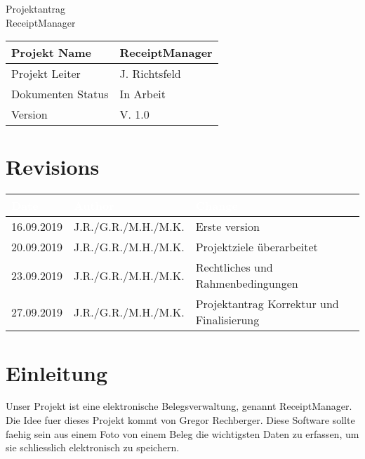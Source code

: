 \documentclass[12pt]{article}
\theoremstyle{definition}
\newcommand{\projectname}{ReceiptManager}
\newcommand{\productname}{ReceiptManager}
\newcommand{\projectleader}{J. Richtsfeld}
\newcommand{\documentstatus}{In Arbeit}
\newcommand{\version}{V. 1.0}
\begin{document}
\begin{titlepage}
\begin{flushright}
\end{flushright}

\vspace{10em}

\begin{center}
{\Huge Projektantrag} \\[3em]
{\LARGE \productname} \\[3em]
\end{center}

\begin{flushleft}
\begin{tabular}{|l|l|}
\hline
Projekt Name & \projectname \\ \hline
Projekt Leiter & \projectleader \\ \hline
Dokumenten Status & \documentstatus \\ \hline
Version & \version \\ \hline
\end{tabular}
\end{flushleft}

\end{titlepage}
\section*{Revisions}
\begin{tabular}{|l|l|l|}
\hline
\cellcolor[gray]{0.5}\textcolor{white}{Date} & \cellcolor[gray]{0.5}\textcolor{white}{Author} & \cellcolor[gray]{0.5}\textcolor{white}{Change} \\ \hline
16.09.2019&J.R./G.R./M.H./M.K.&Erste version \\ \hline
20.09.2019&J.R./G.R./M.H./M.K.&Projektziele überarbeitet \\ \hline
23.09.2019&J.R./G.R./M.H./M.K.&Rechtliches und Rahmenbedingungen \\ \hline
27.09.2019&J.R./G.R./M.H./M.K.&Projektantrag Korrektur und Finalisierung \\ \hline
\end{tabular}
\pagebreak

\tableofcontents
\pagebreak

\section{Einleitung}
Unser Projekt ist eine elektronische Belegsverwaltung, genannt ReceiptManager. Die Idee fuer dieses Projekt kommt von Gregor Rechberger. Diese Software sollte faehig sein aus einem Foto von einem Beleg die wichtigsten Daten zu erfassen, um sie schliesslich elektronisch zu speichern. 
\pagebreak
\end{document}
